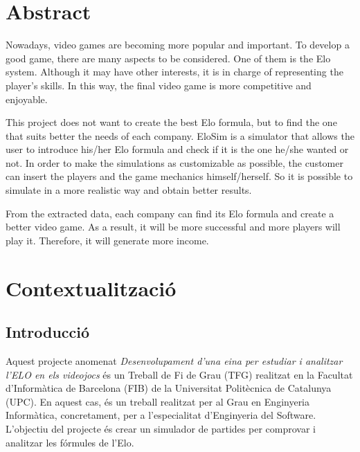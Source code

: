 \documentclass[a4paper]{article}
\begin{document}
\newpage

\section*{Abstract}

Nowadays, video games are becoming more popular and important. To develop a good game, there are many aspects to be considered. One of them is the Elo system. Although it may have other interests, it is in charge of representing the player's skills. In this way, the final video game is more competitive and enjoyable.

This project does not want to create the best Elo formula, but to find the one that suits better the needs of each company. EloSim is a simulator that allows the user to introduce his/her Elo formula and check if it is the one he/she wanted or not. In order to make the simulations as customizable as possible, the customer can insert  the players and the game mechanics himself/herself. So it is possible to simulate in a more realistic way and obtain better results.

From the extracted data, each company can find its Elo formula and create a better video game. As a result, it will be more successful and more players will play it. Therefore, it will generate more income. 

\newpage

\setcounter{page}{1}

\tableofcontents

\newpage

\listoffigures

\newpage

\listoftables

\newpage
\justify
\section{Contextualització}
\subsection{Introducció}
Aquest projecte anomenat \textit{Desenvolupament d'una eina per estudiar i analitzar l'ELO en els videojocs} és un Treball de Fi de Grau (TFG) realitzat en la Facultat d'Informàtica de Barcelona (FIB) de la Universitat Politècnica de Catalunya (UPC). En aquest cas, és un treball realitzat per al Grau en Enginyeria Informàtica, concretament, per a l'especialitat d'Enginyeria del Software. L'objectiu del projecte és crear un simulador de partides per comprovar i analitzar les fórmules de l'Elo.
\end{document}
